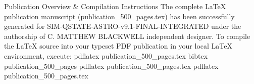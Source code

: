 Publication Overview & Compilation Instructions
The complete LaTeX publication manuscript (publication_500_pages.tex) has been successfully generated for SIM-QSTATE-ASTRO-v9.1-FINAL-INTEGRATED under the authorship of C. MATTHEW BLACKWELL independent designer.
To compile the LaTeX source into your typeset PDF publication in your local LaTeX environment, execute:
pdflatex publication_500_pages.tex
bibtex publication_500_pages
pdflatex publication_500_pages.tex
pdflatex publication_500_pages.tex

